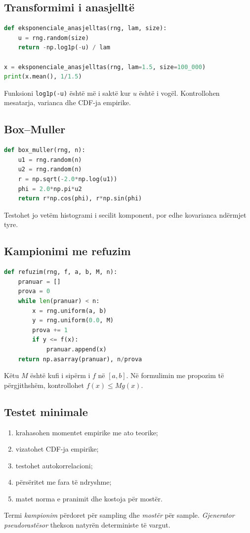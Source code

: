 \documentclass[11pt,oneside,openany]{book}
\begin{document}
\subsection{Transformimi i anasjelltë}
\begin{lstlisting}[language=Python,caption={Mostra eksponenciale pa përdorur funksionin e gatshëm.}]
def eksponenciale_anasjelltas(rng, lam, size):
    u = rng.random(size)
    return -np.log1p(-u) / lam

x = eksponenciale_anasjelltas(rng, lam=1.5, size=100_000)
print(x.mean(), 1/1.5)
\end{lstlisting}
Funksioni \texttt{log1p(-u)} është më i saktë kur $u$ është i vogël. Kontrollohen mesatarja, varianca dhe CDF-ja empirike.

\subsection{Box--Muller}
\begin{lstlisting}[language=Python,caption={Gjenerimi i çifteve Gauss standarde.}]
def box_muller(rng, n):
    u1 = rng.random(n)
    u2 = rng.random(n)
    r = np.sqrt(-2.0*np.log(u1))
    phi = 2.0*np.pi*u2
    return r*np.cos(phi), r*np.sin(phi)
\end{lstlisting}
Testohet jo vetëm histogrami i secilit komponent, por edhe kovarianca ndërmjet tyre.

\subsection{Kampionimi me refuzim}
\begin{lstlisting}[language=Python,caption={Refuzimi për një dendësi në interval të fundmë.}]
def refuzim(rng, f, a, b, M, n):
    pranuar = []
    prova = 0
    while len(pranuar) < n:
        x = rng.uniform(a, b)
        y = rng.uniform(0.0, M)
        prova += 1
        if y <= f(x):
            pranuar.append(x)
    return np.asarray(pranuar), n/prova
\end{lstlisting}
Këtu $M$ është kufi i sipërm i $f$ në $[a,b]$. Në formulimin me propozim të përgjithshëm, kontrollohet $f(x)\le M g(x)$.

\subsection{Testet minimale}
\begin{enumerate}
\item krahasohen momentet empirike me ato teorike;
\item vizatohet CDF-ja empirike;
\item testohet autokorrelacioni;
\item përsëritet me fara të ndryshme;
\item matet norma e pranimit dhe kostoja për mostër.
\end{enumerate}
Termi \emph{kampionim} përdoret për sampling dhe \emph{mostër} për sample. \emph{Gjenerator pseudorastësor} thekson natyrën deterministe të vargut.
\end{document}
